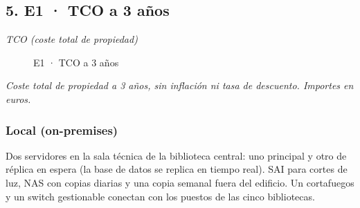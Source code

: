 \subsection*{5. E1 · TCO a 3 años}

\emph{TCO (coste total de propiedad)}

\begin{figure}[H]
\centering
{}
\caption{E1 · TCO a 3 años}
\end{figure}

\emph{Coste total de propiedad a 3 años, sin inflación ni tasa de descuento. Importes en euros.}

\subsubsection*{Local (on-premises)}

Dos servidores en la sala técnica de la biblioteca central: uno principal y otro de réplica en espera (la base de datos se replica en tiempo real). SAI para cortes de luz, NAS con copias diarias y una copia semanal fuera del edificio. Un cortafuegos y un switch gestionable conectan con los puestos de las cinco bibliotecas.

